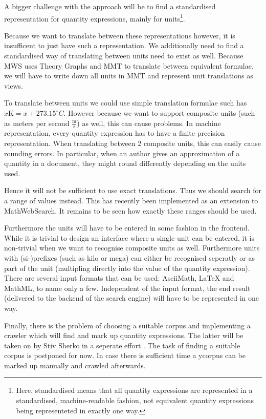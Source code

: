\documentclass[11pt]{article}
\begin{document}
A bigger challenge with the approach will be to find a standardised representation for quantity expressions, mainly for units\footnote{Here, standardised means that all quantity expressions are represented in a standardised, machine-readable fashion, not equivalent quantity expressions being representeted in exactly one way. }.

Because we want to translate between these representations however, it is insufficent to just have such a representation. We additionally need to find a standardised way of translating between units need to exist as well. Because MWS uses Theory Graphs and MMT to translate between equivalent formulae, we will have to write down all units in MMT and represent unit translations as views.

To translate between units we could use simple translation formulae such has $x \text{K} = x + 273.15 ^\circ{C} $. However because we want to support composite units (such as meters per second $\frac{\text{m}}{\text{s}}$) as well, this can cause problems. In machine representation, every quantity expression has to have a finite precision representation. When translating between 2 composite units, this can easily cause rounding errors. In particular, when an author gives an approximation of a quantity in a document, they might round differently depending on the units used.

Hence it will not be sufficient to use exact translations. Thus we should search for a range of values instead. This has recently been implemented as an extension to MathWebSearch\cite{MWS:Ranges}. It remains to be seen how exactly these ranges should be used.

Furthermore the units will have to be entered in some fashion in the frontend. While it is trivial to design an interface where a single unit can be entered, it is non-trivial when we want to recognise composite units as well. Furthermore units with (si-)prefixes (such as kilo or mega) can either be recognised seperatly or as part of the unit (multipling directly into the value of the quantity expression). There are several input formats that can be used: AsciiMath, \LaTeX{} and MathML, to name only a few. Independent of the input format, the end result (delivered to the backend of the search engine) will have to be represented in one way.

Finally, there is the problem of choosing a suitable corpus and implementing a crawler which will find and mark up quantity expressions. The latter will be taken on by
Stiv Sherko in a seperate effort \cite{proposal:sharko}. The task of finding a suitable corpus is postponed for now. In case there is sufficient time a ycorpus can be marked up manually and crawled afterwards.


{}
\end{document}
